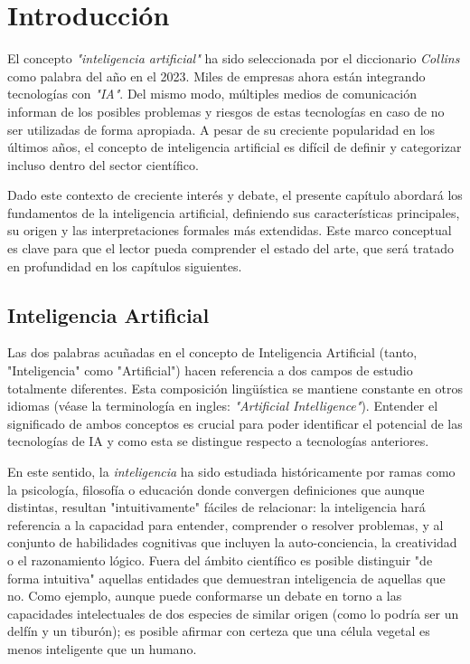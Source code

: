 \chapter{Introducción}

El concepto \emph{"inteligencia artificial"} ha sido seleccionada por el
diccionario \emph{Collins} como palabra del año en el 2023. Miles de empresas ahora
están integrando tecnologías con \emph{"IA"}. Del mismo modo, múltiples medios
de comunicación informan de los posibles problemas y riesgos de estas
tecnologías en caso de no ser utilizadas de forma apropiada. A pesar de su
creciente popularidad en los últimos años, el concepto de inteligencia
artificial es difícil de definir y categorizar incluso dentro del sector
científico.

Dado este contexto de creciente interés y debate, el presente capítulo abordará
los fundamentos de la inteligencia artificial, definiendo sus características
principales, su origen y las interpretaciones formales más extendidas. Este
marco conceptual es clave para que el lector pueda comprender el estado del
arte, que será tratado en profundidad en los capítulos siguientes.

\section{Inteligencia Artificial}
\label{sec:artificial_intelligence}

Las dos palabras acuñadas en el concepto de Inteligencia Artificial 
(tanto, "Inteligencia" como "Artificial") hacen referencia a dos campos de 
estudio totalmente diferentes. Esta composición lingüística se mantiene constante
en otros idiomas (véase la terminología en ingles: \emph{"Artificial Intelligence"}).
Entender el significado de ambos conceptos es crucial para poder identificar el 
potencial de las tecnologías de IA y como esta se distingue respecto a tecnologías anteriores.

En este sentido, la \emph{inteligencia} ha sido estudiada históricamente por
ramas como la psicología, filosofía o educación donde convergen 
definiciones que aunque distintas, resultan "intuitivamente" fáciles de
relacionar: la inteligencia hará referencia a la capacidad para entender,
comprender o resolver problemas, y al conjunto de habilidades cognitivas que
incluyen la auto-conciencia, la creatividad o el razonamiento lógico. Fuera del ámbito
científico es posible distinguir "de forma intuitiva" aquellas entidades que demuestran
inteligencia de aquellas que no. Como ejemplo, aunque puede conformarse un debate en
torno a las capacidades intelectuales de dos especies de similar origen (como lo
podría ser un delfín y un tiburón); es posible afirmar con certeza que una
célula vegetal es menos inteligente que un humano.

